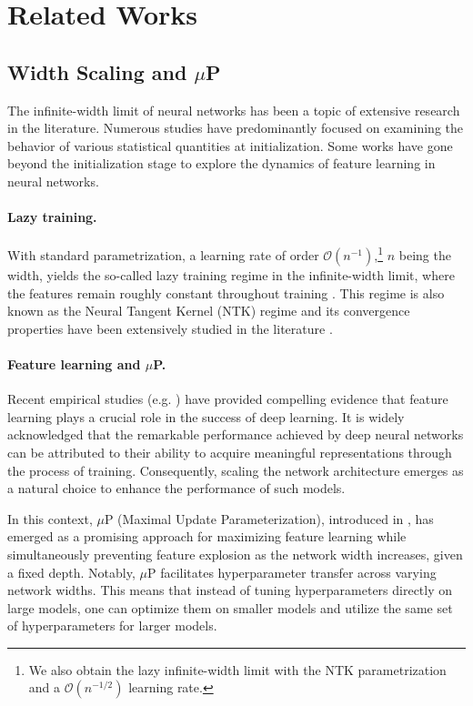 \section{Related Works}
\subsection{Width Scaling and $\mu$P} The infinite-width limit of neural networks has been a topic of extensive research in the literature. Numerous studies have predominantly focused on examining the behavior of various statistical quantities at initialization. Some works have gone beyond the initialization stage to explore the dynamics of feature learning in neural networks.
\paragraph{Lazy training.} With standard parametrization, a learning rate of order $\mathcal{O}(n^{-1})$,\footnote{We also obtain the lazy infinite-width limit with the NTK parametrization and a $\mathcal{O}(n^{-1/2})$ learning rate.} $n$ being the width, yields the so-called lazy training regime in the infinite-width limit, where the features remain roughly constant throughout training \citep{chizat2020lazy, yang2022tensor}. This regime is also known as the Neural Tangent Kernel (NTK) regime and its convergence properties have been extensively studied in the literature \citep{jacot2020neural, allenzhu2019convergence, chizat2018global, zou2018stochastic}. 

\paragraph{Feature learning and $\mu$P.} Recent empirical studies (e.g. \cite{yang2022tensor}) have provided compelling evidence that feature learning plays a crucial role in the success of deep learning. It is widely acknowledged that the remarkable performance achieved by deep neural networks can be attributed to their ability to acquire meaningful representations through the process of training. Consequently, scaling the network architecture emerges as a natural choice to enhance the performance of such models.

In this context, $\mu$P (Maximal Update Parameterization), introduced in \cite{yang2022tensor}, has emerged as a promising approach for maximizing feature learning while simultaneously preventing feature explosion as the network width increases, given a fixed depth. Notably, $\mu$P facilitates hyperparameter transfer across varying network widths. This means that instead of tuning hyperparameters directly on large models, one can optimize them on smaller models and utilize the same set of hyperparameters for larger models.

